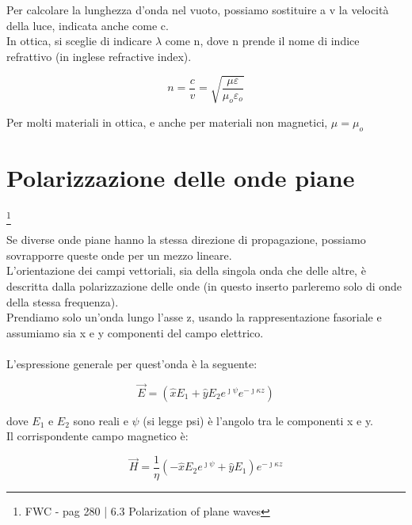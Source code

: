Per calcolare la lunghezza d'onda nel vuoto, possiamo sostituire a v la velocità della luce, indicata anche come c. \\ 

In ottica, si sceglie di indicare $\lambda$ come n, dove n prende il nome di indice refrattivo (in inglese refractive index). 

{\Large \begin{equation}
    n = \frac{c}{v} = \sqrt{\frac{\mu \varepsilon}{\mu_o \varepsilon_o}}
\end{equation}}

Per molti materiali in ottica, e anche per materiali non magnetici, $\mu = \mu_o$

\newpage

\section{Polarizzazione delle onde piane} 
\footnote{FWC - pag 280 | 6.3 Polarization of plane waves} 

Se diverse onde piane hanno la stessa direzione di propagazione, 
possiamo sovrapporre queste onde per un mezzo lineare. \\ 

L'orientazione dei campi vettoriali, sia della singola onda che delle altre, è descritta dalla polarizzazione delle onde 
(in questo inserto parleremo solo di onde della stessa frequenza). \\ 

Prendiamo solo un'onda lungo l'asse z, usando la rappresentazione fasoriale e assumiamo sia x e y componenti del campo elettrico. \\ \\ 
L'espressione generale per quest'onda è la seguente: 

{\Large \begin{equation}
    \vec{E} = (\hat{x} E_1 + \hat{y} E_2 e^{\jmath \psi } e^{-\jmath \kappa z})
\end{equation}}

dove $E_1$ e $E_2$ sono reali e $\psi$ (si legge psi) è l'angolo tra le componenti x e y. \\ 

Il corrispondente campo magnetico è: 

{\Large \begin{equation}
    \vec{H} = \frac{1}{\eta} (-\hat{x} E_2 e^{\jmath \psi} + \hat{y}E_1) e^{-\jmath \kappa z}
\end{equation}}

